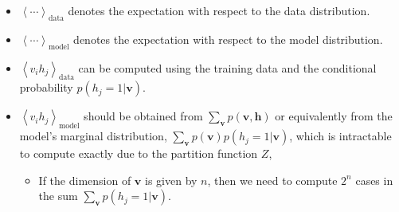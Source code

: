 \documentclass[10pt, a4paper]{article}
\begin{document}
\begin{itemize}
  \item $\left<\cdots\right>_{\text{data}}$ denotes the expectation with respect to the data distribution.
  \item $\left<\cdots\right>_{\text{model}}$ denotes the expectation with respect to the model distribution.
  \item $\left<v_i h_j\right>_{\text{data}}$ can be computed using the training data and the conditional
    probability $p(h_j=1|\mathbf{v})$.
  \item $\left<v_i h_j\right>_{\text{model}}$ should be obtained from $\sum_{\mathbf{v}} p(\mathbf{v},\mathbf{h})$
    or equivalently from the model's marginal distribution, $\sum_{\mathbf{v}} p(\mathbf{v}) p(h_j=1|\mathbf{v})$,
    which is intractable to compute exactly due to the partition function $Z$,
    \begin{itemize}
      \item If the dimension of $\mathbf{v}$ is given by $n$, then we need to compute $2^n$ cases in the
      sum $\sum_{\mathbf{v}} p(h_j=1|\mathbf{v})$.
    \end{itemize}
\end{itemize}
\end{document}
